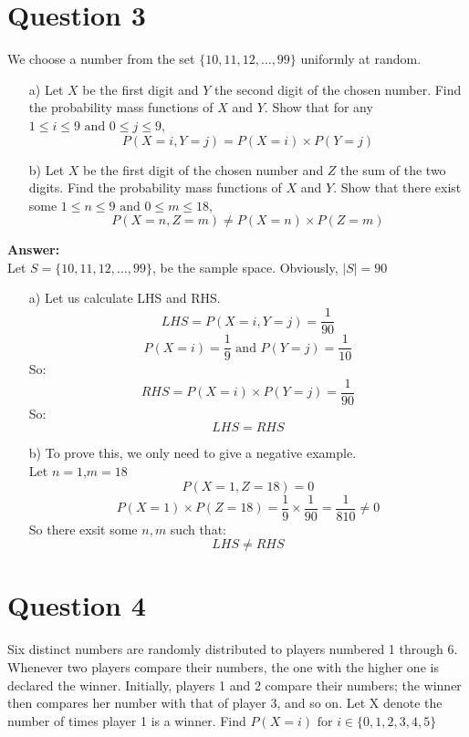 \documentclass[hidelinks]{article}
\begin{document}
\section{Question 3}
We choose a number from the set $\{10, 11, 12,\dots, 99\}$ uniformly at random.
\begin{enumerate}
    \item[a)] Let $X$ be the first digit and $Y$ the second digit of the chosen number. Find the probability mass functions of $X$ and $Y$. Show that for any $1 \leq i \leq 9 \text{ and } 0 \leq j \leq 9$,
    $$P(X = i, Y = j) = P(X = i) \times P(Y = j)$$
    \item[b)] Let $X$ be the first digit of the chosen number and $Z$ the sum of the two digits. Find the probability mass functions of $X$ and $Y$. Show that there exist some $1 \leq n \leq 9 \text{ and } 0 \leq m \leq 18$,
    $$P(X = n, Z = m)\neq P(X = n) \times P(Z = m)$$
\end{enumerate}

\textbf{\large Answer:}\\
Let $S = \{10, 11, 12,\dots, 99\}$, be the sample space. Obviously, $|S| = 90$
\begin{enumerate}
    \item[a)] Let us calculate LHS and RHS.
    $$ LHS = P(X = i, Y = j) = \frac{1}{90}$$
    $$ P(X = i) = \frac{1}{9} \text{ and } P(Y = j) = \frac{1}{10}$$
    So:
    $$ RHS = P(X = i) \times P(Y = j) = \frac{1}{90}$$
    So:
    $$ LHS = RHS$$
    \item[b)] To prove this, we only need to give a negative example.\\
    Let $n = 1$,$m = 18$
    $$P(X = 1, Z = 18) = 0$$
    $$P(X = 1) \times P(Z = 18) = \frac{1}{9} \times \frac{1}{90} = \frac{1}{810} \neq 0$$
    So there exsit some $n,m$ such that:
    $$ LHS \neq RHS$$
\end{enumerate}



\section{Question 4}
Six distinct numbers are randomly distributed to players numbered 1 through 6. Whenever two players compare their numbers, the one with the higher one is declared the winner. Initially, players 1 and 2 compare their numbers; the winner then compares her number with that of player 3, and so on. Let X denote the number of times player 1 is a winner. Find $ P(X = i)\text{ for } i \in \{0, 1, 2, 3, 4, 5\}$
\end{document}
